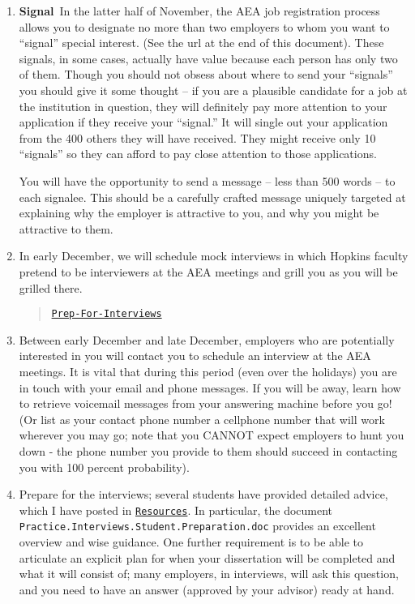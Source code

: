 \documentclass{\classes/econtex}
\begin{document}
\begin{enumerate}
\item \ifdvi\hypertarget{Signal}{\textbf{Signal}~}\fi In the latter half of November, the AEA job registration process 
  allows you to designate no more than two employers to whom you want
  to ``signal'' special interest.  (See the url at the end of this
  document).  These signals, in some cases, actually have value because 
  each person has only two of them.  Though you should not obsess about 
  where to send your ``signals'' you should give it some thought -- if you
  are a plausible candidate for a job at the institution in question, they
  will definitely pay more attention to your application if they receive your 
  ``signal.''  It will single out your application from the 400 others they will have received.
  They might receive only 10 ``signals'' so they can afford to pay close attention
  to those applications.

  You will have the opportunity to send a message -- less than 500 words -- to each signalee.  This should be a carefully crafted message uniquely targeted at explaining why the employer is attractive to you, and why you might be attractive to them.

  
  \hypertarget{Mock-Interviews}{}
\item In early December, we will schedule mock interviews in which
  Hopkins faculty pretend to be interviewers at the AEA meetings and
  grill you as you will be grilled there.

  \begin{quote}
    \href{\pageurl/Steps#Prep-For-Interviews}{\texttt{Prep-For-Interviews}}
    \end{quote}
  
  \hypertarget{Be-Reachable}{}
\item Between early December and late December, employers who are
  potentially interested in you will contact you to schedule an
  interview at the AEA meetings.  It is vital that during this period
  (even over the holidays) you are in touch with your email and phone
  messages.  If you will be away, learn how to retrieve voicemail
  messages from your answering machine before you go!  (Or list as
  your contact phone number a cellphone number that will work wherever
  you may go; note that you CANNOT expect employers to hunt you down -
  the phone number you provide to them should succeed in contacting
  you with 100 percent probability).
  
  \hypertarget{Prep-For-Interviews}{} %
\item Prepare for the interviews; several students have provided
  detailed advice, which I have posted in \href{\treeurl/Resources}{\texttt{Resources}}.  In particular, the document
  \texttt{Practice.Interviews.Student.Preparation.doc} provides an
  excellent overview and wise guidance. One further requirement is to be
  able to articulate an explicit plan for when your dissertation will
  be completed and what it will consist of; many employers, in
  interviews, will ask this question, and you need to have an answer
  (approved by your advisor) ready at hand.


\end{enumerate}
\end{document}
